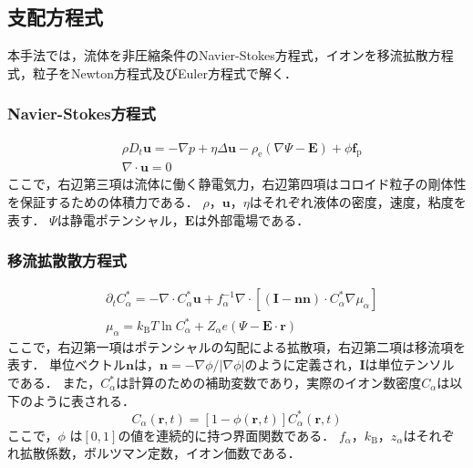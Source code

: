\subsection{支配方程式}
\par 本手法では，流体を非圧縮条件のNavier-Stokes方程式，イオンを移流拡散方程式，粒子をNewton方程式及びEuler方程式で解く．
\subsubsection{Navier-Stokes方程式}
%
\vspace*{-2.5zh}
%
\begin{eqnarray}
	& {\rho}D_{t}\boldsymbol{u} = -{\nabla}p+\eta\Delta\boldsymbol{u}-\rho_{\textrm{e}}(\nabla\Psi-\boldsymbol{E})+\phi\boldsymbol{f}_{\textrm{p}}\\
	& \nabla\cdot\boldsymbol{u} = 0
\end{eqnarray}
%
ここで，右辺第三項は流体に働く静電気力，右辺第四項はコロイド粒子の剛体性を保証するための体積力である．
$\rho$，$\boldsymbol{u}$，$\eta$はそれぞれ液体の密度，速度，粘度を表す．
$\Psi$は静電ポテンシャル，$\boldsymbol{E}$は外部電場である．
%
\subsubsection{移流拡散散方程式}
%
\vspace*{-2.5zh}
%
\begin{eqnarray}
	& {\partial_t}{C^*_\alpha} = -\nabla\cdot{C^*_\alpha}\boldsymbol{u}+f^{-1}_\alpha\nabla\cdot[(\boldsymbol{I}-\boldsymbol{n}\boldsymbol{n})\cdot{C^*_\alpha}\nabla\mu_\alpha]\\
	& \mu_\alpha = k_{\textrm{B}}T\ln{C^*_\alpha}+Z_\alpha e(\Psi-\boldsymbol{E}\cdot\boldsymbol{r}) 
\end{eqnarray}
%
ここで，右辺第一項はポテンシャルの勾配による拡散項，右辺第二項は移流項を表す．
単位ベクトル$\boldsymbol{n}$は，$\boldsymbol{n}=-\nabla\phi / |\nabla\phi|$のように定義され，$\boldsymbol{I}$は単位テンソルである．
また，$C_{\alpha}^*$は計算のための補助変数であり，実際のイオン数密度$C_{\alpha}$は以下のように表される．
%
\begin{equation}
C_\alpha (\boldsymbol{r},t) =[1-\phi (\boldsymbol{r},t)]C_{\alpha}^* (\boldsymbol{r},t)
\end{equation}
%
ここで，$\phi$ は$[0,1]$の値を連続的に持つ界面関数である．
$f_\alpha$，$k_{\textrm{B}}$，$z_\alpha$はそれぞれ拡散係数，ボルツマン定数，イオン価数である．
%
